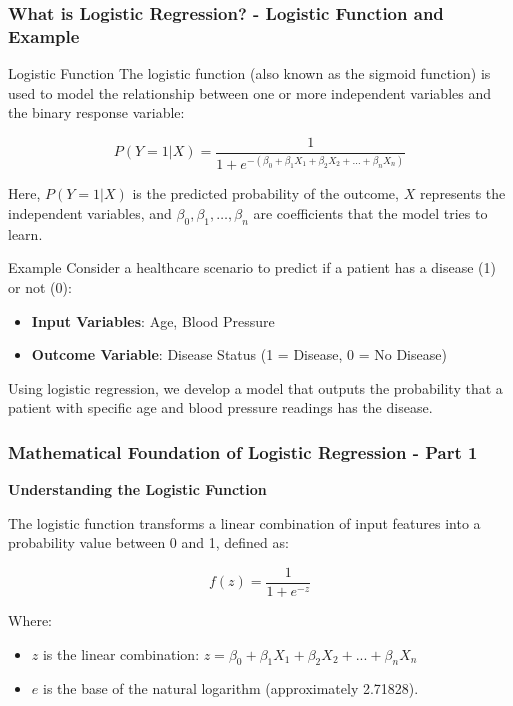 \documentclass[aspectratio=169]{beamer}
\begin{document}
\begin{frame}[fragile]
    \frametitle{What is Logistic Regression? - Logistic Function and Example}
    \begin{block}{Logistic Function}
        The logistic function (also known as the sigmoid function) is used to model the relationship between one or more independent variables and the binary response variable:

        \begin{equation}
        P(Y=1|X) = \frac{1}{1 + e^{-(\beta_0 + \beta_1X_1 + \beta_2X_2 + \ldots + \beta_nX_n)}}
        \end{equation}

        Here, $P(Y=1|X)$ is the predicted probability of the outcome, $X$ represents the independent variables, and $\beta_0, \beta_1, \ldots, \beta_n$ are coefficients that the model tries to learn.
    \end{block}

    \begin{block}{Example}
        Consider a healthcare scenario to predict if a patient has a disease (1) or not (0):
        \begin{itemize}
            \item \textbf{Input Variables}: Age, Blood Pressure
            \item \textbf{Outcome Variable}: Disease Status (1 = Disease, 0 = No Disease)
        \end{itemize}
        Using logistic regression, we develop a model that outputs the probability that a patient with specific age and blood pressure readings has the disease.
    \end{block}
\end{frame}

\begin{frame}[fragile]
    \frametitle{Mathematical Foundation of Logistic Regression - Part 1}
    \textbf{Understanding the Logistic Function}
    
    The logistic function transforms a linear combination of input features into a probability value between 0 and 1, defined as:
    
    \begin{equation}
        f(z) = \frac{1}{1 + e^{-z}}
    \end{equation}
    
    Where:
    \begin{itemize}
        \item \( z \) is the linear combination: \( z = \beta_0 + \beta_1X_1 + \beta_2X_2 + ... + \beta_nX_n \)
        \item \( e \) is the base of the natural logarithm (approximately 2.71828).
    \end{itemize}
\end{frame}
\end{document}
